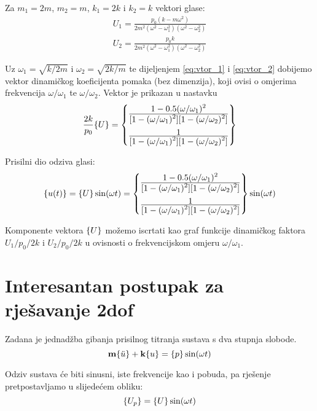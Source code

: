Za $m_1=2m$, $m_2=m$, $k_1=2k$ i $k_2=k$ vektori glase:
\begin{align}
    U_1=\frac{p_0(k-m\omega^2)}{2m^2(\omega^2-\omega_1^2)(\omega^2-\omega_2^2)}\label{eq:vtor_1}\\
    U_2=\frac{p_0k}{2m^2(\omega^2-\omega_1^2)(\omega^2-\omega_2^2)}\label{eq:vtor_2}
\end{align}

Uz $\omega_1=\sqrt{k/2m}$ i $\omega_2=\sqrt{2k/m}$ te dijeljenjem \eqref{eq:vtor_1} i \eqref{eq:vtor_2}
dobijemo vektor dinamičkog koeficijenta pomaka (bez dimenzija), koji ovisi o
omjerima frekvencija $\omega/\omega_1$ te $\omega/\omega_2$. Vektor je prikazan u nastavku
\begin{equation}
    \frac{2k}{p_0}\vtor{U}{}
    =
    \begin{Bmatrix}
        \ffrac{1-0.5(\omega/\omega_1)^2}
              {[1-(\omega/\omega_1)^2][1-(\omega/\omega_2)^2]}\\[12pt]
        \ffrac{1}
              {[1-(\omega/\omega_1)^2][1-(\omega/\omega_2)^2]}
    \end{Bmatrix}
\end{equation}

Prisilni dio odziva glasi:
\begin{equation}
    \vtor{u(t)}{} = \vtor{U}{}\sin(\omega t) = 
    \begin{Bmatrix}
        \ffrac{1-0.5(\omega/\omega_1)^2}
              {[1-(\omega/\omega_1)^2][1-(\omega/\omega_2)^2]}\\[12pt]
        \ffrac{1}
              {[1-(\omega/\omega_1)^2][1-(\omega/\omega_2)^2]}
    \end{Bmatrix}
    \sin(\omega t)
\end{equation}

Komponente vektora $\vtor{U}{}$ možemo iscrtati kao graf funkcije dinamičkog faktora
$U_1/p_0/2k$ i $U_2/p_0/2k$ u ovisnosti o frekvencijskom omjeru $\omega/\omega_1$.

\section{Interesantan postupak za rješavanje 2dof}
Zadana je jednadžba gibanja prisilnog titranja sustava s dva stupnja slobode.
\begin{equation}\label{eq:jdn_gibanja_osnovno}
    \mm\vtor{u}{:}+\kk\vtor{u}{}=\vtor{p}{}\sin(\omega t)
\end{equation}

Odziv sustava će biti sinusni, iste frekvencije kao i pobuda, pa rješenje
pretpostavljamo u slijedećem obliku:
\begin{equation}\label{eq:pretpostavljeno}
    \vtor{U_p}{}=\vtor{U}{}\sin(\omega t)
\end{equation}

